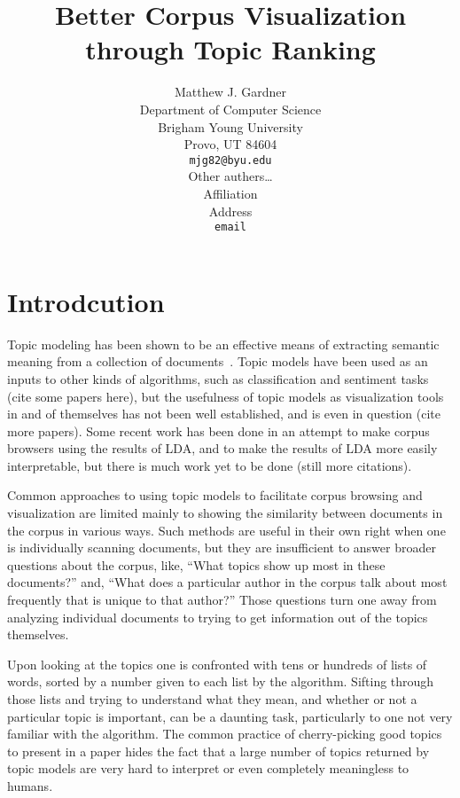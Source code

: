 \documentclass{article}
\title{Better Corpus Visualization through Topic Ranking}
\author{
Matthew J. Gardner \\
Department of Computer Science \\
Brigham Young University \\
Provo, UT 84604 \\
\texttt{mjg82@byu.edu} \\
\And
Other authers\ldots \\
Affiliation \\
Address \\
\texttt{email} \\
}
\begin{document}
\maketitle

\begin{abstract}
\end{abstract}

\section{Introdcution}
\label{sec:introduction}

Topic modeling has been shown to be an effective means of extracting semantic
meaning from a collection of
documents~\cite{blei-2003-latent-dirichlet-allocation}.  Topic models have been
used as an inputs to other kinds of algorithms, such as classification and
sentiment tasks (cite some papers here), but the usefulness of topic models as
visualization tools in and of themselves has not been well established, and is
even in question (cite more papers).  Some recent work has been done in an
attempt to make corpus browsers using the results of LDA, and to make the
results of LDA more easily interpretable, but there is much work yet to be done
(still more citations).  

Common approaches to using topic models to facilitate corpus browsing and
visualization are limited mainly to showing the similarity between documents in
the corpus in various ways.  Such methods are useful in their own right when
one is individually scanning documents, but they are insufficient to answer
broader questions about the corpus, like, ``What topics show up most in these
documents?'' and, ``What does a particular author in the corpus talk about most
frequently that is unique to that author?''  Those questions turn one away from
analyzing individual documents to trying to get information out of the topics
themselves.

Upon looking at the topics one is confronted with tens or hundreds of lists of
words, sorted by a number given to each list by the algorithm.  Sifting through
those lists and trying to understand what they mean, and whether or not a
particular topic is important, can be a daunting task, particularly to one not
very familiar with the algorithm.  The common practice of cherry-picking good
topics to present in a paper hides the fact that a large number of topics
returned by topic models are very hard to interpret or even completely
meaningless to humans.
\end{document}
